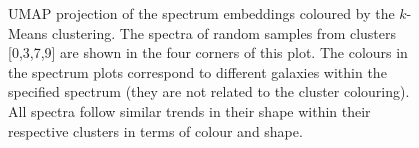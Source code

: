 \documentclass[a4paper,12pt]{article}
\begin{document}
\begin{figure}[H]
    \centering
    \vspace{-1cm}
    \caption{UMAP projection of the spectrum embeddings coloured by the $k$-Means clustering. The spectra of random samples from clusters [0,3,7,9] are shown in the four corners of this plot. The colours in the spectrum plots correspond to different galaxies within the specified spectrum (they are not related to the cluster colouring). All spectra follow similar trends in their shape within their respective clusters in terms of colour and shape.}
    \label{fig:annotated_spectra}
\end{figure}
\end{document}
